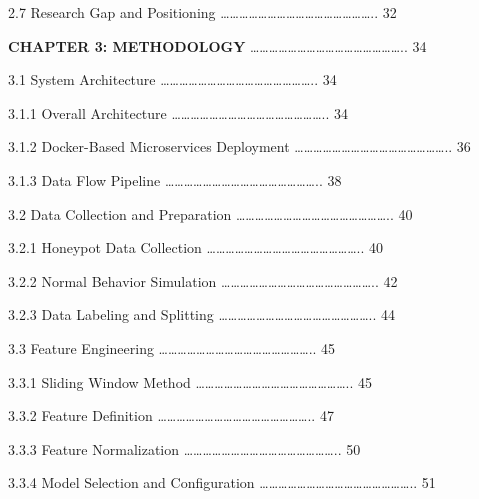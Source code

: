 \documentclass[
  a4paper]{report}
\begin{document}
2.7 Research Gap and Positioning
\ldots\ldots\ldots\ldots\ldots\ldots\ldots\ldots\ldots\ldots\ldots\ldots\ldots\ldots\ldots\ldots..
32

\textbf{CHAPTER 3: METHODOLOGY}
\ldots\ldots\ldots\ldots\ldots\ldots\ldots\ldots\ldots\ldots\ldots\ldots\ldots\ldots\ldots\ldots..
34

3.1 System Architecture
\ldots\ldots\ldots\ldots\ldots\ldots\ldots\ldots\ldots\ldots\ldots\ldots\ldots\ldots\ldots\ldots..
34

3.1.1 Overall Architecture
\ldots\ldots\ldots\ldots\ldots\ldots\ldots\ldots\ldots\ldots\ldots\ldots\ldots\ldots\ldots\ldots..
34

3.1.2 Docker-Based Microservices Deployment
\ldots\ldots\ldots\ldots\ldots\ldots\ldots\ldots\ldots\ldots\ldots\ldots\ldots\ldots\ldots\ldots..
36

3.1.3 Data Flow Pipeline
\ldots\ldots\ldots\ldots\ldots\ldots\ldots\ldots\ldots\ldots\ldots\ldots\ldots\ldots\ldots\ldots..
38

3.2 Data Collection and Preparation
\ldots\ldots\ldots\ldots\ldots\ldots\ldots\ldots\ldots\ldots\ldots\ldots\ldots\ldots\ldots\ldots..
40

3.2.1 Honeypot Data Collection
\ldots\ldots\ldots\ldots\ldots\ldots\ldots\ldots\ldots\ldots\ldots\ldots\ldots\ldots\ldots\ldots..
40

3.2.2 Normal Behavior Simulation
\ldots\ldots\ldots\ldots\ldots\ldots\ldots\ldots\ldots\ldots\ldots\ldots\ldots\ldots\ldots\ldots..
42

3.2.3 Data Labeling and Splitting
\ldots\ldots\ldots\ldots\ldots\ldots\ldots\ldots\ldots\ldots\ldots\ldots\ldots\ldots\ldots\ldots..
44

3.3 Feature Engineering
\ldots\ldots\ldots\ldots\ldots\ldots\ldots\ldots\ldots\ldots\ldots\ldots\ldots\ldots\ldots\ldots..
45

3.3.1 Sliding Window Method
\ldots\ldots\ldots\ldots\ldots\ldots\ldots\ldots\ldots\ldots\ldots\ldots\ldots\ldots\ldots\ldots..
45

3.3.2 Feature Definition
\ldots\ldots\ldots\ldots\ldots\ldots\ldots\ldots\ldots\ldots\ldots\ldots\ldots\ldots\ldots\ldots..
47

3.3.3 Feature Normalization
\ldots\ldots\ldots\ldots\ldots\ldots\ldots\ldots\ldots\ldots\ldots\ldots\ldots\ldots\ldots\ldots..
50

3.3.4 Model Selection and Configuration
\ldots\ldots\ldots\ldots\ldots\ldots\ldots\ldots\ldots\ldots\ldots\ldots\ldots\ldots\ldots\ldots..
51
\end{document}
